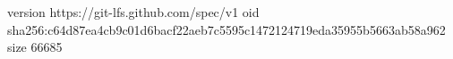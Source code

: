 version https://git-lfs.github.com/spec/v1
oid sha256:c64d87ea4cb9c01d6bacf22aeb7c5595c1472124719eda35955b5663ab58a962
size 66685
